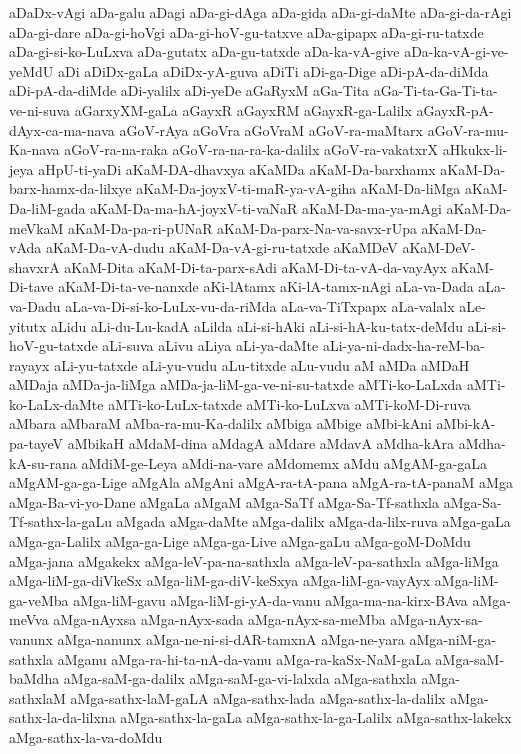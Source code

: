 {aDaDx-vAgi
aDa-galu
aDagi
aDa-gi-dAga
aDa-gida
aDa-gi-daMte
aDa-gi-da-rAgi
aDa-gi-dare
aDa-gi-hoVgi
aDa-gi-hoV-gu-tatxve
aDa-gipapx
aDa-gi-ru-tatxde
aDa-gi-si-ko-LuLxva
aDa-gutatx
aDa-gu-tatxde
aDa-ka-vA-give
aDa-ka-vA-gi-ve-yeMdU
aDi
aDiDx-gaLa
aDiDx-yA-guva
aDiTi
aDi-ga-Dige
aDi-pA-da-diMda
aDi-pA-da-diMde
aDi-yalilx
aDi-yeDe
aGaRyxM
aGa-Tita
aGa-Ti-ta-Ga-Ti-ta-ve-ni-suva
aGarxyXM-gaLa
aGayxR
aGayxRM
aGayxR-ga-Lalilx
aGayxR-pA-dAyx-ca-ma-nava
aGoV-rAya
aGoVra
aGoVraM
aGoV-ra-maMtarx
aGoV-ra-mu-Ka-nava
aGoV-ra-na-raka
aGoV-ra-na-ra-ka-dalilx
aGoV-ra-vakatxrX
aHkukx-li-jeya
aHpU-ti-yaDi
aKaM-DA-dhavxya
aKaMDa
aKaM-Da-barxhamx
aKaM-Da-barx-hamx-da-lilxye
aKaM-Da-joyxV-ti-maR-ya-vA-giha
aKaM-Da-liMga
aKaM-Da-liM-gada
aKaM-Da-ma-hA-joyxV-ti-vaNaR
aKaM-Da-ma-ya-mAgi
aKaM-Da-meVkaM
aKaM-Da-pa-ri-pUNaR
aKaM-Da-parx-Na-va-savx-rUpa
aKaM-Da-vAda
aKaM-Da-vA-dudu
aKaM-Da-vA-gi-ru-tatxde
aKaMDeV
aKaM-DeV-shavxrA
aKaM-Dita
aKaM-Di-ta-parx-sAdi
aKaM-Di-ta-vA-da-vayAyx
aKaM-Di-tave
aKaM-Di-ta-ve-nanxde
aKi-lAtamx
aKi-lA-tamx-nAgi
aLa-va-Dada
aLa-va-Dadu
aLa-va-Di-si-ko-LuLx-vu-da-riMda
aLa-va-TiTxpapx
aLa-valalx
aLe-yitutx
aLidu
aLi-du-Lu-kadA
aLilda
aLi-si-hAki
aLi-si-hA-ku-tatx-deMdu
aLi-si-hoV-gu-tatxde
aLi-suva
aLivu
aLiya
aLi-ya-daMte
aLi-ya-ni-dadx-ha-reM-ba-rayayx
aLi-yu-tatxde
aLi-yu-vudu
aLu-titxde
aLu-vudu
aM
aMDa
aMDaH
aMDaja
aMDa-ja-liMga
aMDa-ja-liM-ga-ve-ni-su-tatxde
aMTi-ko-LaLxda
aMTi-ko-LaLx-daMte
aMTi-ko-LuLx-tatxde
aMTi-ko-LuLxva
aMTi-koM-Di-ruva
aMbara
aMbaraM
aMba-ra-mu-Ka-dalilx
aMbiga
aMbige
aMbi-kAni
aMbi-kA-pa-tayeV
aMbikaH
aMdaM-dina
aMdagA
aMdare
aMdavA
aMdha-kAra
aMdha-kA-su-rana
aMdiM-ge-Leya
aMdi-na-vare
aMdomemx
aMdu
aMgAM-ga-gaLa
aMgAM-ga-ga-Lige
aMgAla
aMgAni
aMgA-ra-tA-pana
aMgA-ra-tA-panaM
aMga
aMga-Ba-vi-yo-Dane
aMgaLa
aMgaM
aMga-SaTf
aMga-Sa-Tf-sathxla
aMga-Sa-Tf-sathx-la-gaLu
aMgada
aMga-daMte
aMga-dalilx
aMga-da-lilx-ruva
aMga-gaLa
aMga-ga-Lalilx
aMga-ga-Lige
aMga-ga-Live
aMga-gaLu
aMga-goM-DoMdu
aMga-jana
aMgakekx
aMga-leV-pa-na-sathxla
aMga-leV-pa-sathxla
aMga-liMga
aMga-liM-ga-diVkeSx
aMga-liM-ga-diV-keSxya
aMga-liM-ga-vayAyx
aMga-liM-ga-veMba
aMga-liM-gavu
aMga-liM-gi-yA-da-vanu
aMga-ma-na-kirx-BAva
aMga-meVva
aMga-nAyxsa
aMga-nAyx-sada
aMga-nAyx-sa-meMba
aMga-nAyx-sa-vanunx
aMga-nanunx
aMga-ne-ni-si-dAR-tamxnA
aMga-ne-yara
aMga-niM-ga-sathxla
aMganu
aMga-ra-hi-ta-nA-da-vanu
aMga-ra-kaSx-NaM-gaLa
aMga-saM-baMdha
aMga-saM-ga-dalilx
aMga-saM-ga-vi-lalxda
aMga-sathxla
aMga-sathxlaM
aMga-sathx-laM-gaLA
aMga-sathx-lada
aMga-sathx-la-dalilx
aMga-sathx-la-da-lilxna
aMga-sathx-la-gaLa
aMga-sathx-la-ga-Lalilx
aMga-sathx-lakekx
aMga-sathx-la-va-doMdu
}
